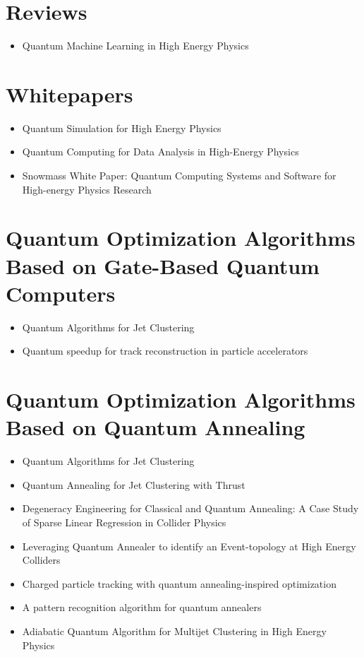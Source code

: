 \section{Reviews}

\begin{itemize}
   \item Quantum Machine Learning in High Energy Physics~\cite{Guan:2020bdl}
\end{itemize}


\section{Whitepapers}

\begin{itemize}
   \item Quantum Simulation for High Energy Physics~\cite{Bauer:2022hpo}
   \item Quantum Computing for Data Analysis in High-Energy Physics~\cite{Delgado:2022tpc}
   \item Snowmass White Paper: Quantum Computing Systems and Software for High-energy Physics Research~\cite{Humble:2022vtm}
\end{itemize}


\section{Quantum Optimization Algorithms Based on Gate-Based Quantum Computers}

\begin{itemize}
   \item Quantum Algorithms for Jet Clustering~\cite{Wei:2019rqy}
   \item Quantum speedup for track reconstruction in particle accelerators~\cite{Magano:2021jzd}
\end{itemize}


\section{Quantum Optimization Algorithms Based on Quantum Annealing}

\begin{itemize}
   \item Quantum Algorithms for Jet Clustering~\cite{Wei:2019rqy}
   \item Quantum Annealing for Jet Clustering with Thrust~\cite{Delgado:2022snu}
   \item Degeneracy Engineering for Classical and Quantum Annealing: A Case Study of Sparse Linear Regression in Collider Physics~\cite{Anschuetz:2022rwu}
   \item Leveraging Quantum Annealer to identify an Event-topology at High Energy Colliders~\cite{Kim:2021wrr}
   \item Charged particle tracking with quantum annealing-inspired optimization~\cite{Zlokapa:2019tkn}
   \item A pattern recognition algorithm for quantum annealers~\cite{Bapst:2019llh}
   \item Adiabatic Quantum Algorithm for Multijet Clustering in High Energy Physics~\cite{Pires:2020urc}
\end{itemize}


